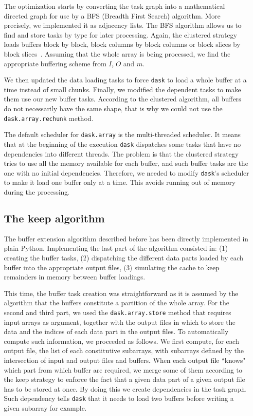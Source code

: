 \documentclass[conference]{IEEEtran}
\begin{document}
The optimization starts by converting the task graph into a mathematical
directed graph for use by a BFS (Breadth First Search) algorithm. More
precisely, we implemented it as adjacency lists. The BFS algorithm allows us to
find and store tasks by type for later processing.  Again, the clustered
strategy loads buffers block by block, block columns by block columns or block
slices by block slices~\cite{seqalgorithms}. Assuming that the whole array is
being processed, we find the appropriate buffering scheme from $I$, $O$ and $m$.

We then updated the data loading tasks to force \texttt{dask} to load a whole buffer at
a time instead of small chunks. Finally, we modified the dependent tasks to make
them use our new buffer tasks. According to the clustered algorithm, all buffers
do not necessarily have the same shape, that is why we could not use the
\texttt{dask.array.rechunk} method.

The default scheduler for \texttt{dask.array} is the multi-threaded scheduler. It means
that at the beginning of the execution \texttt{dask} dispatches some tasks that have
no dependencies into different threads. The problem is that the clustered
strategy tries to use all the memory available for each buffer, and such buffer
tasks are the one with no initial dependencies. Therefore, we needed to
modify \texttt{dask}'s scheduler to make it load one buffer only at a time.
This avoids running out of memory during the processing.

\subsection{The keep algorithm}

The buffer extension algorithm described before has been directly
implemented in plain Python. Implementing the last part of the algorithm
consisted in: (1) creating the buffer tasks, (2) dispatching the different data
parts loaded by each buffer into the appropriate output files, (3) simulating
the cache to keep remainders in memory between buffer loadings.

This time, the buffer task creation was straightforward as it is assumed by the
algorithm that the buffers constitute a partition of the whole array. For the
second and third part, we used the \texttt{dask.array.store} method that
requires input arrays as argument, together with the output files in which to
store the data and the indices of each data part in the output files. To
automatically compute such information, we proceeded as follows. We first
compute, for each output file, the list of each constitutive subarrays, with
subarrays defined by the intersection of input and output files and buffers.
When each output file ``knows" which part from which buffer are required, we
merge some of them according to the keep strategy to enforce the fact that
a given data part of a given output file has to be stored at once. By doing this
we create dependencies in the task graph. Such dependency tells \texttt{dask} that it
needs to load two buffers before writing a given subarray for example.
\end{document}
